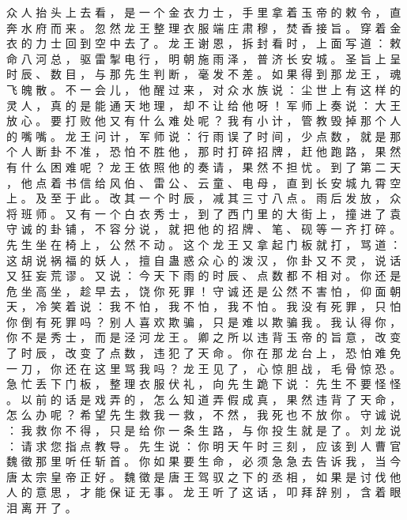 {众 人 抬 头 上 去 看 ， 是 一 个 金 衣 力 士 ， 手 里 拿 着 玉 帝 的 敕 令 ， 直 奔 水 府 而 来 。
忽 然 龙 王 整 理 衣 服 端 庄 肃 穆 ， 焚 香 接 旨 。
穿 着 金 衣 的 力 士 回 到 空 中 去 了 。
龙 王 谢 恩 ， 拆 封 看 时 ， 上 面 写 道 ： 敕 命 八 河 总 ， 驱 雷 掣 电 行 ， 明 朝 施 雨 泽 ， 普 济 长 安 城 。
圣 旨 上 呈 时 辰 、 数 目 ， 与 那 先 生 判 断 ， 毫 发 不 差 。
如 果 得 到 那 龙 王 ， 魂 飞 魄 散 。
不 一 会 儿 ， 他 醒 过 来 ， 对 众 水 族 说 ： 尘 世 上 有 这 样 的 灵 人 ， 真 的 是 能 通 天 地 理 ， 却 不 让 给 他 呀 ！ 军 师 上 奏 说 ： 大 王 放 心 。
要 打 败 他 又 有 什 么 难 处 呢 ？ 我 有 小 计 ， 管 教 毁 掉 那 个 人 的 嘴 嘴 。
龙 王 问 计 ， 军 师 说 ： 行 雨 误 了 时 间 ， 少 点 数 ， 就 是 那 个 人 断 卦 不 准 ， 恐 怕 不 胜 他 ， 那 时 打 碎 招 牌 ， 赶 他 跑 路 ， 果 然 有 什 么 困 难 呢 ？ 龙 王 依 照 他 的 奏 请 ， 果 然 不 担 忧 。
到 了 第 二 天 ， 他 点 着 书 信 给 风 伯 、 雷 公 、 云 童 、 电 母 ， 直 到 长 安 城 九 霄 空 上 。
及 至 于 此 。
改 其 一 个 时 辰 ， 减 其 三 寸 八 点 。
雨 后 发 放 ， 众 将 班 师 。
又 有 一 个 白 衣 秀 士 ， 到 了 西 门 里 的 大 街 上 ， 撞 进 了 袁 守 诚 的 卦 铺 ， 不 容 分 说 ， 就 把 他 的 招 牌 、 笔 、 砚 等 一 齐 打 碎 。
先 生 坐 在 椅 上 ， 公 然 不 动 。
这 个 龙 王 又 拿 起 门 板 就 打 ， 骂 道 ： 这 胡 说 祸 福 的 妖 人 ， 擅 自 蛊 惑 众 心 的 泼 汉 ， 你 卦 又 不 灵 ， 说 话 又 狂 妄 荒 谬 。
又 说 ： 今 天 下 雨 的 时 辰 、 点 数 都 不 相 对 。
你 还 是 危 坐 高 坐 ， 趁 早 去 ， 饶 你 死 罪 ！ 守 诚 还 是 公 然 不 害 怕 ， 仰 面 朝 天 ， 冷 笑 着 说 ： 我 不 怕 ， 我 不 怕 ， 我 不 怕 。
我 没 有 死 罪 ， 只 怕 你 倒 有 死 罪 吗 ？
别 人 喜 欢 欺 骗 ， 只 是 难 以 欺 骗 我 。
我 认 得 你 ， 你 不 是 秀 士 ， 而 是 泾 河 龙 王 。
卿 之 所 以 违 背 玉 帝 的 旨 意 ， 改 变 了 时 辰 ， 改 变 了 点 数 ， 违 犯 了 天 命 。
你 在 那 龙 台 上 ， 恐 怕 难 免 一 刀 ， 你 还 在 这 里 骂 我 吗 ？ 龙 王 见 了 ， 心 惊 胆 战 ， 毛 骨 惊 恐 。
急 忙 丢 下 门 板 ， 整 理 衣 服 伏 礼 ， 向 先 生 跪 下 说 ： 先 生 不 要 怪 怪 。
以 前 的 话 是 戏 弄 的 ， 怎 么 知 道 弄 假 成 真 ， 果 然 违 背 了 天 命 ， 怎 么 办 呢 ？ 希 望 先 生 救 我 一 救 ， 不 然 ， 我 死 也 不 放 你 。
守 诚 说 ： 我 救 你 不 得 ， 只 是 给 你 一 条 生 路 ， 与 你 投 生 就 是 了 。
刘 龙 说 ： 请 求 您 指 点 教 导 。
先 生 说 ： 你 明 天 午 时 三 刻 ， 应 该 到 人 曹 官 魏 徵 那 里 听 任 斩 首 。
你 如 果 要 生 命 ， 必 须 急 急 去 告 诉 我 ， 当 今 唐 太 宗 皇 帝 正 好 。
魏 徵 是 唐 王 驾 驭 之 下 的 丞 相 ， 如 果 是 讨 伐 他 人 的 意 思 ， 才 能 保 证 无 事 。
龙 王 听 了 这 话 ， 叩 拜 辞 别 ， 含 着 眼 泪 离 开 了 。
}
